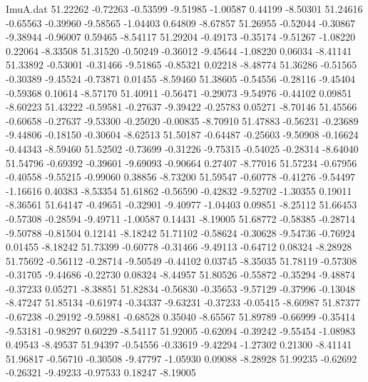 \begin{filecontents}{ImuA.dat}
  51.22262   -0.72263   -0.53599   -9.51985   -1.00587    0.44199   -8.50301
  51.24616   -0.65563   -0.39960   -9.58565   -1.04403    0.64809   -8.67857
  51.26955   -0.52044   -0.30867   -9.38944   -0.96007    0.59465   -8.54117
  51.29204   -0.49173   -0.35174   -9.51267   -1.08220    0.22064   -8.33508
  51.31520   -0.50249   -0.36012   -9.45644   -1.08220    0.06034   -8.41141
  51.33892   -0.53001   -0.31466   -9.51865   -0.85321    0.02218   -8.48774
  51.36286   -0.51565   -0.30389   -9.45524   -0.73871    0.01455   -8.59460
  51.38605   -0.54556   -0.28116   -9.45404   -0.59368    0.10614   -8.57170
  51.40911   -0.56471   -0.29073   -9.54976   -0.44102    0.09851   -8.60223
  51.43222   -0.59581   -0.27637   -9.39422   -0.25783    0.05271   -8.70146
  51.45566   -0.60658   -0.27637   -9.53300   -0.25020   -0.00835   -8.70910
  51.47883   -0.56231   -0.23689   -9.44806   -0.18150   -0.30604   -8.62513
  51.50187   -0.64487   -0.25603   -9.50908   -0.16624   -0.44343   -8.59460
  51.52502   -0.73699   -0.31226   -9.75315   -0.54025   -0.28314   -8.64040
  51.54796   -0.69392   -0.39601   -9.69093   -0.90664    0.27407   -8.77016
  51.57234   -0.67956   -0.40558   -9.55215   -0.99060    0.38856   -8.73200
  51.59547   -0.60778   -0.41276   -9.54497   -1.16616    0.40383   -8.53354
  51.61862   -0.56590   -0.42832   -9.52702   -1.30355    0.19011   -8.36561
  51.64147   -0.49651   -0.32901   -9.40977   -1.04403    0.09851   -8.25112
  51.66453   -0.57308   -0.28594   -9.49711   -1.00587    0.14431   -8.19005
  51.68772   -0.58385   -0.28714   -9.50788   -0.81504    0.12141   -8.18242
  51.71102   -0.58624   -0.30628   -9.54736   -0.76924    0.01455   -8.18242
  51.73399   -0.60778   -0.31466   -9.49113   -0.64712    0.08324   -8.28928
  51.75692   -0.56112   -0.28714   -9.50549   -0.44102    0.03745   -8.35035
  51.78119   -0.57308   -0.31705   -9.44686   -0.22730    0.08324   -8.44957
  51.80526   -0.55872   -0.35294   -9.48874   -0.37233    0.05271   -8.38851
  51.82834   -0.56830   -0.35653   -9.57129   -0.37996   -0.13048   -8.47247
  51.85134   -0.61974   -0.34337   -9.63231   -0.37233   -0.05415   -8.60987
  51.87377   -0.67238   -0.29192   -9.59881   -0.68528    0.35040   -8.65567
  51.89789   -0.66999   -0.35414   -9.53181   -0.98297    0.60229   -8.54117
  51.92005   -0.62094   -0.39242   -9.55454   -1.08983    0.49543   -8.49537
  51.94397   -0.54556   -0.33619   -9.42294   -1.27302    0.21300   -8.41141
  51.96817   -0.56710   -0.30508   -9.47797   -1.05930    0.09088   -8.28928
  51.99235   -0.62692   -0.26321   -9.49233   -0.97533    0.18247   -8.19005

\end{filecontents}
